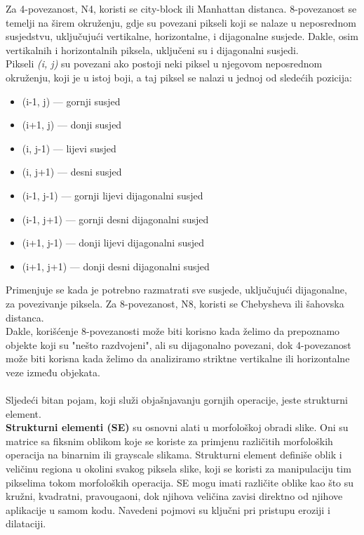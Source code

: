 \documentclass[a4paper,12pt]{article}
\begin{document}
Za 4-povezanost, N4, koristi se city-block ili Manhattan distanca.
8-povezanost se temelji na širem okruženju, gdje su povezani pikseli koji se nalaze u neposrednom susjedstvu, uključujući vertikalne, horizontalne, i dijagonalne susjede. Dakle, osim vertikalnih i horizontalnih piksela, uključeni su i dijagonalni susjedi.\\

Pikseli \textit{ (i, j)} su povezani ako postoji neki piksel u njegovom neposrednom okruženju, koji je u istoj boji, a taj piksel se nalazi u jednoj od sledećih pozicija:
\begin{itemize}
\item (i-1, j) — gornji susjed
\item (i+1, j) — donji susjed
\item (i, j-1) — lijevi susjed
\item (i, j+1) — desni susjed

\item (i-1, j-1) — gornji lijevi dijagonalni susjed
\item (i-1, j+1) — gornji desni dijagonalni susjed
\item (i+1, j-1) — donji lijevi dijagonalni susjed
\item (i+1, j+1) — donji desni dijagonalni susjed

\end{itemize}

Primenjuje se kada je potrebno razmatrati sve susjede, uključujući dijagonalne, za povezivanje piksela.
 Za 8-povezanost, N8, koristi se Chebysheva ili šahovska distanca. \\
Dakle, korišćenje 8-povezanosti može biti korisno kada želimo da prepoznamo objekte koji su "nešto razdvojeni", ali su dijagonalno povezani, dok 4-povezanost može biti korisna kada želimo da analiziramo striktne vertikalne ili horizontalne veze između objekata.
\\ \\
Sljedeći bitan pojam, koji služi objašnjavanju gornjih operacije, jeste strukturni element.\\

 \textbf{Strukturni elementi (SE) }su osnovni alati u morfološkoj obradi slike.
Oni su matrice sa fiksnim oblikom koje se koriste za primjenu različitih morfoloških operacija na binarnim ili grayscale slikama. 
Strukturni element definiše oblik i veličinu regiona u okolini svakog piksela slike, koji se koristi za manipulaciju tim pikselima tokom morfoloških operacija. 
SE mogu imati različite oblike kao što su kružni, kvadratni, pravougaoni, dok njihova veličina zavisi direktno od njihove aplikacije u samom kodu. 
Navedeni pojmovi su ključni pri pristupu eroziji i dilataciji. \\
\end{document}

